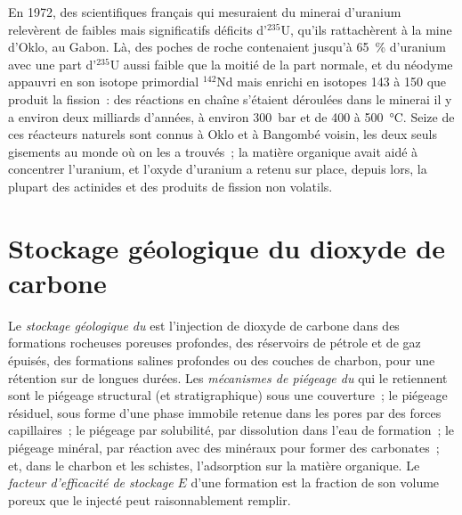 \begin{history}
En 1972, des scientifiques français qui mesuraient du minerai d'uranium relevèrent de faibles mais significatifs déficits d'$^{235}$U,
qu'ils rattachèrent à la mine d'Oklo, au Gabon. Là, des poches de roche contenaient jusqu'à \qty{65}{\percent} d'uranium avec une part d'$^{235}$U
aussi faible que la moitié de la part normale, et du néodyme appauvri en son isotope primordial $^{142}$Nd
mais enrichi en isotopes 143 à 150 que produit la fission~:
des réactions en chaîne s'étaient déroulées dans le minerai il y a environ deux milliards d'années,
à environ \qty{300}{bar} et de 400 à \qty{500}{\celsius}. Seize de ces réacteurs naturels sont connus à Oklo et à Bangombé voisin,
les deux seuls gisements au monde où on les a trouvés~; la matière organique avait aidé à concentrer l'uranium,
et l'oxyde d'uranium a retenu sur place, depuis lors, la plupart des actinides
et des produits de fission non volatils.
\end{history}

\section{Stockage géologique du dioxyde de carbone}\label{sec:b2:energy-geology:ccs}

\begin{definition}\label{def:b2:energy-geology:ccs}
Le \emph{stockage géologique du } est l'injection de dioxyde de carbone
dans des formations rocheuses poreuses profondes, des réservoirs de pétrole et de gaz épuisés, des formations salines profondes
ou des couches de charbon, pour une rétention sur de longues durées. Les \emph{mécanismes de piégeage du }
qui le retiennent sont le piégeage structural (et stratigraphique) sous une couverture~; le piégeage résiduel, sous forme
d'une phase immobile retenue dans les pores par des forces capillaires~; le piégeage par solubilité, par dissolution dans
l'eau de formation~; le piégeage minéral, par réaction avec des minéraux pour former des carbonates~; et, dans le charbon et
les schistes, l'adsorption sur la matière organique. Le \emph{facteur d'efficacité de stockage}
$E$ d'une formation est la fraction de son volume poreux que le
 injecté peut raisonnablement remplir.
\end{definition}

